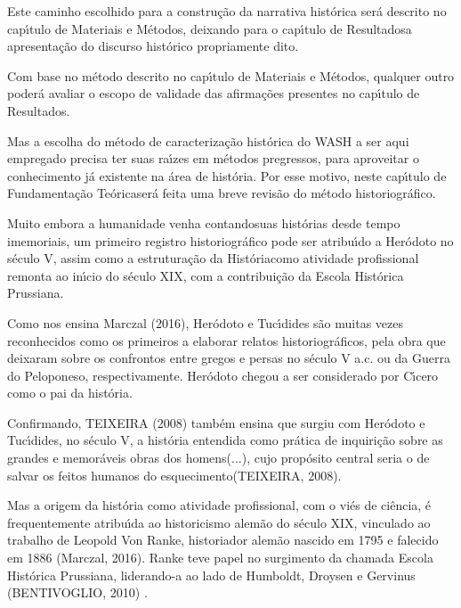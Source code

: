 \documentclass[
12pt,		%
openright,	%
twoside,  %
a4paper,			%
chapter=TITLE,		%
english,			%
french,				%
spanish,			%
brazil				%
]{USPSC-classe/USPSC}
\begin{document}
Este caminho escolhido para a constru\c{c}\~ao da narrativa hist\'orica ser\'a descrito no cap\'{\i}tulo de \textquotedbl Materiais e M\'etodos\textquotedbl , deixando para o cap\'{\i}tulo de \textquotedbl Resultados\textquotedbl  a apresenta\c{c}\~ao do discurso hist\'orico propriamente dito.




Com base no m\'etodo descrito no cap\'{\i}tulo de \textquotedbl Materiais e M\'etodos\textquotedbl , qualquer outro poder\'a avaliar o escopo de validade das afirma\c{c}\~oes presentes no cap\'{\i}tulo de \textquotedbl Resultados\textquotedbl .




Mas a escolha do m\'etodo de caracteriza\c{c}\~ao hist\'orica do WASH a ser aqui empregado precisa ter suas ra\'{\i}zes em m\'etodos pregressos, para aproveitar o conhecimento j\'a existente na \'area de hist\'oria. Por esse motivo, neste cap\'{\i}tulo de \textquotedbl Fundamenta\c{c}\~ao Te\'orica\textquotedbl  ser\'a feita uma breve revis\~ao do m\'etodo historiogr\'afico.




Muito embora a humanidade venha \textquotedbl contando\textquotedbl  suas hist\'orias desde tempo imemoriais, um primeiro registro historiogr\'afico pode ser atribu\'{\i}do a Her\'odoto no s\'eculo V, assim como a estrutura\c{c}\~ao da \textquotedbl Hist\'oria\textquotedbl  como atividade profissional remonta ao in\'{\i}cio do s\'eculo XIX, com a contribui\c{c}\~ao da Escola Hist\'orica Prussiana.




Como nos ensina  Marczal (2016),  Her\'odoto e Tuc\'{\i}dides s\~ao muitas vezes reconhecidos como os primeiros a elaborar relatos historiogr\'aficos, pela obra que deixaram sobre os confrontos entre gregos e persas no s\'eculo V a.c. ou da Guerra do Peloponeso, respectivamente. Her\'odoto chegou a ser considerado por C\'{\i}cero como o \textquotedbl pai da hist\'oria\textquotedbl .




Confirmando, TEIXEIRA (2008)  tamb\'em ensina que surgiu com Her\'odoto e Tuc\'{\i}dides, no s\'eculo V, a hist\'oria \textquotedbl entendida como pr\'atica de inquiri\c{c}\~ao sobre as grandes e memor\'aveis obras dos homens(...), cujo prop\'osito central seria o de salvar os feitos humanos do esquecimento\textquotedbl   (TEIXEIRA, 2008).




Mas a origem da hist\'oria como atividade profissional, com o vi\'es de ci\^encia, \'e frequentemente atribu\'{\i}da ao historicismo alem\~ao do s\'eculo XIX, vinculado ao trabalho de Leopold Von Ranke, historiador alem\~ao nascido em 1795 e falecido em 1886 (Marczal, 2016). Ranke teve papel no surgimento da chamada Escola Hist\'orica Prussiana, liderando-a ao lado de Humboldt, Droysen e Gervinus  (BENTIVOGLIO, 2010) .
\end{document}
